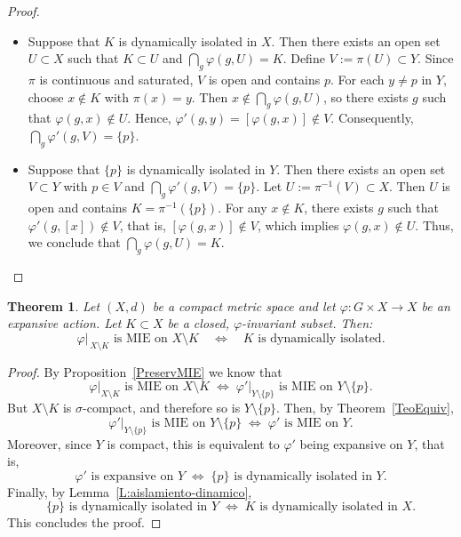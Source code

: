 \documentclass[12pt]{amsart}
\theoremstyle{plain}
\newtheorem{theorem}{Theorem}[section]
\theoremstyle{definition}
\theoremstyle{remark}
\begin{document}
\begin{proof}
\begin{itemize}
  \item[\(\Rightarrow\)] Suppose that \(K\) is dynamically isolated in \(X\). Then there exists an open set \(U\subset X\) such that 
  \(K\subset U\) and \(\bigcap_{g}\varphi(g,U)=K\). Define \(V := \pi(U)\subset Y\). Since \(\pi\) is continuous and saturated, \(V\) is open and contains \(p\). For each \(y\neq p\) in \(Y\), choose \(x\notin K\) with \(\pi(x)=y\). Then \(x\notin \bigcap_{g}\varphi(g,U)\), so there exists \(g\) such that \(\varphi(g,x)\notin U\). Hence, \(\varphi'(g,y) = [\varphi(g,x)] \notin V\). Consequently, \(\bigcap_{g}\varphi'(g,V)=\{p\}\).
  
  \item[\(\Leftarrow\)] Suppose that \(\{p\}\) is dynamically isolated in \(Y\). Then there exists an open set \(V\subset Y\) with \(p\in V\) and 
  \(\bigcap_{g}\varphi'(g,V)=\{p\}\). Let \(U := \pi^{-1}(V)\subset X\). Then \(U\) is open and contains \(K = \pi^{-1}(\{p\})\). For any \(x\notin K\), there exists \(g\) such that \(\varphi'(g,[x])\notin V\), that is, \([\varphi(g,x)]\notin V\), which implies \(\varphi(g,x)\notin U\). Thus, we conclude that \(\bigcap_{g}\varphi(g,U)=K\).
\end{itemize}
\end{proof}






\begin{theorem}
\label{thmMIEIsolatedComplement}
Let \((X,d)\) be a compact metric space and let \(\varphi : G \times X \rightarrow X\) be an expansive action. Let \(K \subset X\) be a closed, \(\varphi\)-invariant subset. Then:
\[
  \varphi\bigl|_{\,X\setminus K}\text{ is MIE on }X \setminus K
  \quad\Longleftrightarrow\quad
  K\text{ is dynamically isolated.}
\]
\end{theorem}

\begin{proof}
By Proposition~\ref{PreservMIE} we know that
\[
\varphi\bigl|_{X \setminus K} \text{ is MIE on } X \setminus K 
\;\Longleftrightarrow\;
\varphi'\bigl|_{Y \setminus \{p\}} \text{ is MIE on } Y \setminus \{p\}.
\]
But \( X \setminus K \) is \(\sigma\)-compact, and therefore so is \( Y \setminus \{p\} \). Then, by Theorem~\ref{TeoEquiv},
\[
\varphi'\bigl|_{Y \setminus \{p\}} \text{ is MIE on } Y \setminus \{p\}
\;\Longleftrightarrow\;
\varphi' \text{ is MIE on } Y.
\]
Moreover, since \( Y \) is compact, this is equivalent to \(\varphi'\) being expansive on \( Y \), that is,
\[
\varphi' \text{ is expansive on } Y
\;\Longleftrightarrow\;
\{p\} \text{ is dynamically isolated in } Y.
\]
Finally, by Lemma~\ref{L:aislamiento-dinamico},
\[
\{p\} \text{ is dynamically isolated in } Y
\;\Longleftrightarrow\;
K \text{ is dynamically isolated in } X.
\]
This concludes the proof.
\end{proof}
\end{document}
